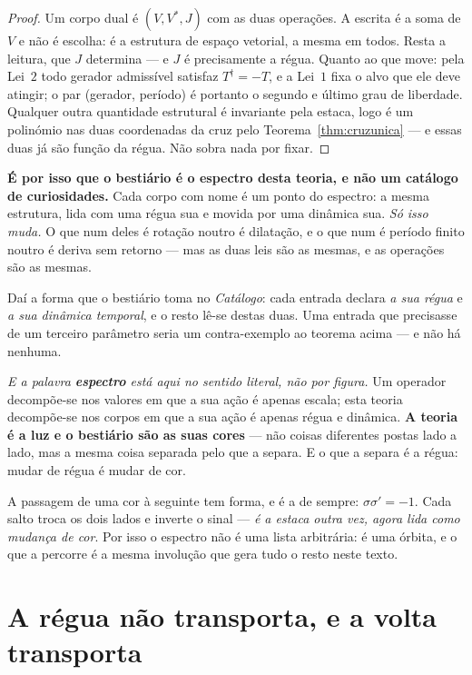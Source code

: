\documentclass[livro.tex]{subfiles}
\begin{document}
\begin{proof}
Um corpo dual é $(V,V^{*},J)$ com as duas operações. A escrita é a soma de $V$ e não é escolha:
é a estrutura de espaço vetorial, a mesma em todos. Resta a leitura, que $J$ determina --- e $J$
é precisamente a régua. Quanto ao que move: pela Lei~$2$ todo gerador admissível satisfaz
$T^{\dagger}=-T$, e a Lei~$1$ fixa o alvo que ele deve atingir; o par (gerador, período) é
portanto o segundo e último grau de liberdade. Qualquer outra quantidade estrutural é invariante
pela estaca, logo é um polinómio nas duas coordenadas da cruz pelo Teorema~\ref{thm:cruzunica} ---
e essas duas já são função da régua. Não sobra nada por fixar.
\end{proof}

\noindent \textbf{É por isso que o bestiário é o espectro desta teoria, e não um catálogo de
curiosidades.} Cada corpo com nome é um ponto do espectro: a mesma estrutura, lida com uma régua
sua e movida por uma dinâmica sua. \emph{Só isso muda.} O que num deles é rotação noutro é
dilatação, e o que num é período finito noutro é deriva sem retorno --- mas as duas leis são as
mesmas, e as operações são as mesmas.

\medskip
\noindent Daí a forma que o bestiário toma no \emph{Catálogo}: cada entrada declara \emph{a sua
régua} e \emph{a sua dinâmica temporal}, e o resto lê-se destas duas. Uma entrada que precisasse
de um terceiro parâmetro seria um contra-exemplo ao teorema acima --- e não há nenhuma.

\medskip
\noindent \emph{E a palavra \textbf{espectro} está aqui no sentido literal, não por figura.} Um
operador decompõe-se nos valores em que a sua ação é apenas escala; esta teoria decompõe-se nos
corpos em que a sua ação é apenas régua e dinâmica. \textbf{A teoria é a luz e o bestiário são as
suas cores} --- não coisas diferentes postas lado a lado, mas a mesma coisa separada pelo que a
separa. E o que a separa é a régua: mudar de régua é mudar de cor.

\medskip
\noindent A passagem de uma cor à seguinte tem forma, e é a de sempre: $\sigma\sigma'=-1$. Cada
salto troca os dois lados e inverte o sinal --- \emph{é a estaca outra vez, agora lida como
mudança de cor}. Por isso o espectro não é uma lista arbitrária: é uma órbita, e o que a percorre
é a mesma involução que gera tudo o resto neste texto.


\section{A régua não transporta, e a volta transporta}\label{sec:transporte}
\end{document}
